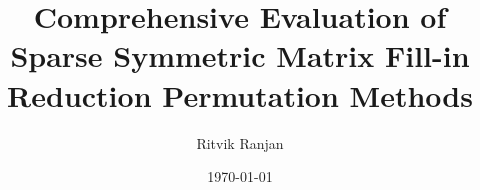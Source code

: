 \documentclass[]{iisreport}
\title{Comprehensive Evaluation of Sparse Symmetric Matrix Fill-in Reduction Permutation Methods}
\author{Ritvik Ranjan}
\date{\today}
\begin{document}
\frontmatter





\tableofcontents

\mainmatter








\appendix

 
% 

\backmatter


 

\listoffigures
\listoftables
\listofalgorithms



\end{document}
